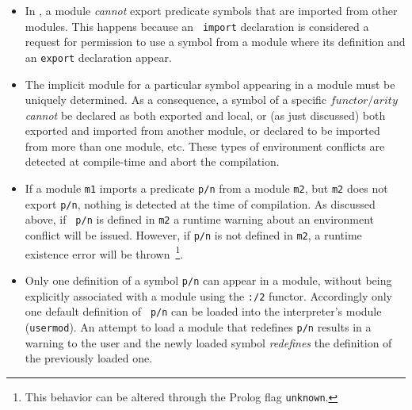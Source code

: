 \begin{itemize}
%
\item In \version{}, a module {\em cannot} export predicate symbols
  that are imported from other modules.  This happens because an {\tt
    import} declaration is considered a request for permission to use
  a symbol from a module where its definition and an {\tt export}
  declaration appear. 
%
\item The implicit module for a particular symbol appearing in a
  module must be uniquely determined.  As a consequence, a symbol of a
  specific $functor/arity$ {\em cannot} be declared as both exported
  and local, or (as just discussed) both exported and imported from
  another module, or declared to be imported from more than one
  module, etc.  These types of environment conflicts are detected at
  compile-time and abort the compilation.
%
\item If a module {\tt m1} imports a predicate {\tt p/n} from a module
  {\tt m2}, but {\tt m2} does not export {\tt p/n}, nothing is
  detected at the time of compilation.  As discussed above, if {\tt
    p/n} is defined in {\tt m2} a runtime warning about an environment
  conflict will be issued.  However, if {\tt p/n} is not defined in
  {\tt m2}, a runtime existence error will be thrown~\footnote{This
    behavior can be altered through the Prolog flag {\tt unknown}.}.
%
\item Only one definition of a symbol {\tt p/n} can appear in a
  module, without being explicitly associated with a module using the
  {\tt :/2} functor.  Accordingly only one default definition of {\tt
    p/n} can be loaded into the interpreter's module ({\tt usermod}).
  An attempt to load a module that redefines {\tt p/n} results in a
  warning to the user and the newly loaded symbol {\em redefines} the
  definition of the previously loaded one.
\end{itemize}
% 
